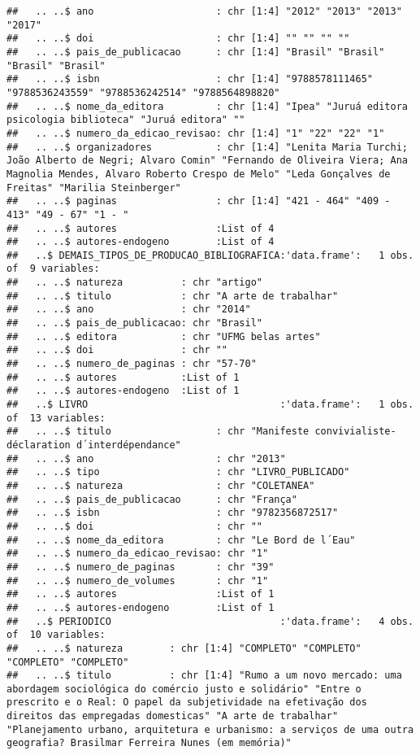 \documentclass[]{article}
\begin{document}
\begin{verbatim}
##   .. ..$ ano                     : chr [1:4] "2012" "2013" "2013" "2017"
##   .. ..$ doi                     : chr [1:4] "" "" "" ""
##   .. ..$ pais_de_publicacao      : chr [1:4] "Brasil" "Brasil" "Brasil" "Brasil"
##   .. ..$ isbn                    : chr [1:4] "9788578111465" "9788536243559" "9788536242514" "9788564898820"
##   .. ..$ nome_da_editora         : chr [1:4] "Ipea" "Juruá editora psicologia biblioteca" "Juruá editora" ""
##   .. ..$ numero_da_edicao_revisao: chr [1:4] "1" "22" "22" "1"
##   .. ..$ organizadores           : chr [1:4] "Lenita Maria Turchi; João Alberto de Negri; Alvaro Comin" "Fernando de Oliveira Viera; Ana Magnolia Mendes, Alvaro Roberto Crespo de Melo" "Leda Gonçalves de Freitas" "Marilia Steinberger"
##   .. ..$ paginas                 : chr [1:4] "421 - 464" "409 - 413" "49 - 67" "1 - "
##   .. ..$ autores                 :List of 4
##   .. ..$ autores-endogeno        :List of 4
##   ..$ DEMAIS_TIPOS_DE_PRODUCAO_BIBLIOGRAFICA:'data.frame':   1 obs. of  9 variables:
##   .. ..$ natureza          : chr "artigo"
##   .. ..$ titulo            : chr "A arte de trabalhar"
##   .. ..$ ano               : chr "2014"
##   .. ..$ pais_de_publicacao: chr "Brasil"
##   .. ..$ editora           : chr "UFMG belas artes"
##   .. ..$ doi               : chr ""
##   .. ..$ numero_de_paginas : chr "57-70"
##   .. ..$ autores           :List of 1
##   .. ..$ autores-endogeno  :List of 1
##   ..$ LIVRO                                 :'data.frame':   1 obs. of  13 variables:
##   .. ..$ titulo                  : chr "Manifeste convivialiste- déclaration d´interdépendance"
##   .. ..$ ano                     : chr "2013"
##   .. ..$ tipo                    : chr "LIVRO_PUBLICADO"
##   .. ..$ natureza                : chr "COLETANEA"
##   .. ..$ pais_de_publicacao      : chr "França"
##   .. ..$ isbn                    : chr "9782356872517"
##   .. ..$ doi                     : chr ""
##   .. ..$ nome_da_editora         : chr "Le Bord de l´Eau"
##   .. ..$ numero_da_edicao_revisao: chr "1"
##   .. ..$ numero_de_paginas       : chr "39"
##   .. ..$ numero_de_volumes       : chr "1"
##   .. ..$ autores                 :List of 1
##   .. ..$ autores-endogeno        :List of 1
##   ..$ PERIODICO                             :'data.frame':   4 obs. of  10 variables:
##   .. ..$ natureza        : chr [1:4] "COMPLETO" "COMPLETO" "COMPLETO" "COMPLETO"
##   .. ..$ titulo          : chr [1:4] "Rumo a um novo mercado: uma abordagem sociológica do comércio justo e solidário" "Entre o prescrito e o Real: O papel da subjetividade na efetivação dos direitos das empregadas domesticas" "A arte de trabalhar" "Planejamento urbano, arquitetura e urbanismo: a serviços de uma outra geografia? Brasilmar Ferreira Nunes (em memória)"

\end{verbatim}
\end{document}
